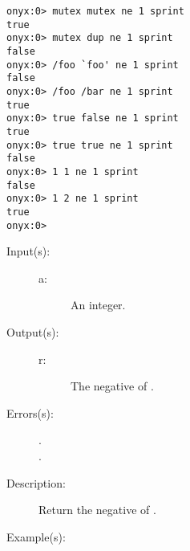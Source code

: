 \begin{description}
\begin{description}
\begin{verbatim}
onyx:0> mutex mutex ne 1 sprint
true
onyx:0> mutex dup ne 1 sprint
false
onyx:0> /foo `foo' ne 1 sprint
false
onyx:0> /foo /bar ne 1 sprint
true
onyx:0> true false ne 1 sprint
true
onyx:0> true true ne 1 sprint
false
onyx:0> 1 1 ne 1 sprint
false
onyx:0> 1 2 ne 1 sprint
true
onyx:0>
		\end{verbatim}
	\end{description}
\label{systemdict:neg}
\item[{\onyxop{a}{neg}{r}}: ]
	\begin{description}\item[]
	\item[Input(s): ]
		\begin{description}\item[]
		\item[a: ]
			An integer.
		\end{description}
	\item[Output(s): ]
		\begin{description}\item[]
		\item[r: ]
			The negative of .
		\end{description}
	\item[Errors(s): ]
		\begin{description}\item[]
		\item[.]
		\item[.]
		\end{description}
	\item[Description: ]
		Return the negative of .
	\item[Example(s): ]\begin{verbatim}


\end{verbatim}
\end{description}
\end{description}
